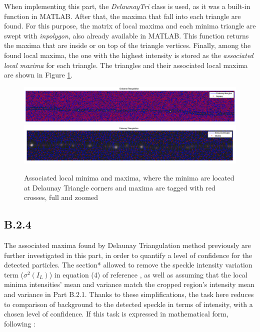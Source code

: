 \documentclass{article}
\begin{document}
When implementing this part, the \emph{DelaunayTri} class is used, as it was a built-in function in MATLAB. After that, the maxima that fall into each triangle are found. For this purpose, the matrix of local maxima and each minima triangle are swept with \emph{inpolygon}, also already available in MATLAB. This function returns the maxima that are inside or on top of the triangle vertices. Finally, among the found local maxima, the one with the highest intensity is stored as the \emph{associated local maxima} for each triangle. The triangles and their associated local maxima are shown in Figure \ref{fig:assocLocal}.

\begin{figure}[H]
\centering
\includegraphics[width=16cm]{figures/delaunay_full.png}
\includegraphics[width=16cm]{figures/delaunay_zoom.png}
\caption{Associated local minima and maxima, where the minima are located at Delaunay Triangle corners and maxima are tagged with red crosses, full and zoomed}
\label{fig:assocLocal}
\end{figure}



\subsection*{B.2.4}
 
The associated maxima found by Delaunay Triangulation method previously are further investigated in this part, in order to quantify a level of confidence for the detected particles. The section* allowed to remove the speckle intensity variation term ($\sigma^2(I_L)$) in equation (4) of reference \cite{ponti}, as well as assuming that the local minima intensities' mean and variance match the cropped region's intensity mean and variance in Part B.2.1. Thanks to these simplifications, the task here reduces to comparison of background to the detected speckle in terms of intensity, with a chosen level of confidence. If this task is expressed in mathematical form, following \cite{ponti}:
\end{document}
